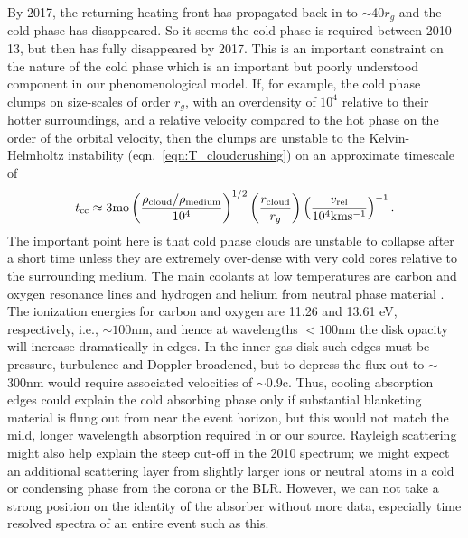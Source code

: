 \documentclass[a4paper,fleqn,usenatbib]{mnras}
\begin{document}
By 2017, the returning heating front has propagated back in to
$\sim$40$r_{g}$ and the cold phase has disappeared. So it seems the
cold phase is required between 2010-13, but then has fully disappeared
by 2017. This is an important constraint on the nature of the cold
phase which is an important but poorly understood component in our
phenomenological model. If, for example, the cold phase clumps on
size-scales of order $r_g$, with an overdensity of $10^{4}$ relative
to their hotter surroundings, and a relative velocity compared to the
hot phase on the order of the orbital velocity, then the clumps are
unstable to the Kelvin-Helmholtz instability
(eqn.~\ref{eqn:T_cloudcrushing}) on an approximate timescale of
\begin{equation}
t_{{\rm cc}} \approx 3{\rm mo} 
               \left( \frac{\rho_{\rm{cloud}}/\rho_{\rm{medium}}}{10^{4}}   \right)^{1/2}
               \left( \frac{r_{\rm cloud}}{r_{g}}\right) 
              \left( \frac{v_{\rm rel}}{10^{4}\rm{km s^{-1}}} \right)^{-1}.
\end{equation}
The important point here is that cold phase clouds are unstable to
collapse after a short time unless they are extremely over-dense with
very cold cores relative to the surrounding medium. The main coolants
at low temperatures are carbon and oxygen resonance lines and hydrogen
and helium from neutral phase material \citep[see e.g., Fig. 18 in
][]{Sutherland_Dopita1993}. The ionization energies for carbon and
oxygen are 11.26 and 13.61 eV, respectively, i.e., $\sim 100$nm, and
hence at wavelengths $<100$nm the disk opacity will increase
dramatically in edges. In the inner gas disk such edges must be
pressure, turbulence and Doppler broadened, but to depress the flux
out to $\sim$300nm would require associated velocities of
$\sim$0.9c. Thus, cooling absorption edges could explain the cold
absorbing phase only if substantial blanketing material is flung out
from near the event horizon, but this would not match the mild, longer
wavelength absorption required in \citet{Guo2016} or our
source. Rayleigh scattering might also help explain the steep cut-off
in the 2010 spectrum; we might expect an additional scattering layer
from slightly larger ions or neutral atoms in a cold or condensing
phase from the corona or the BLR. However, we can not take a strong
position on the identity of the absorber without more data, especially
time resolved spectra of an entire event such as this.




\end{document}
